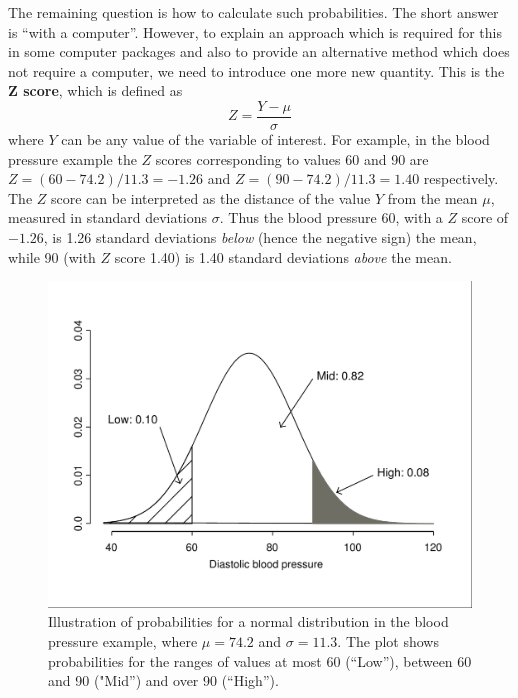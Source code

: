The remaining question is how to calculate such probabilities. The
short answer is ``with a computer''. However, to explain
an approach which is required for this in some computer packages and also
to provide an alternative method which does not require a computer, we
need to introduce one more new quantity. This is the \textbf{Z score},
which is defined as
\begin{equation}
Z = \frac{Y-\mu}{\sigma}
\label{Zscore}
\end{equation}
where $Y$ can be any value of the variable of interest. For example, in
the blood pressure example the $Z$ scores corresponding to values 60 and
90 are $Z=(60-74.2)/11.3=-1.26$ and $Z=(90-74.2)/11.3=1.40$
respectively. The $Z$ score can be interpreted as the distance of the
value $Y$ from the mean $\mu$, measured in standard deviations $\sigma$.
Thus the blood pressure 60, with a $Z$ score of $-1.26$, is 1.26 standard
deviations \emph{below} (hence the negative sign) the mean, while 90
(with $Z$ score 1.40) is 1.40 standard deviations \emph{above} the mean.

\begin{figure}[t]
\caption{
Illustration of probabilities for a normal distribution in
the blood pressure example, where $\mu=74.2$ and $\sigma=11.3$. The
plot shows probabilities for the ranges of values at most 60
(``Low''), between 60 and 90 ("Mid'') and over 90 (``High'').
}
\label{f_normbp}
\begin{center}
\includegraphics[width=12cm]{normbp}
\end{center}

\end{figure}

